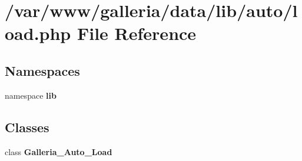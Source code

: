 \section{/var/www/galleria/data/lib/auto/load.php File Reference}
\label{load_8php}
\subsection*{Namespaces}
\begin{CompactItemize}
\item 
namespace {\bf lib}
\end{CompactItemize}
\subsection*{Classes}
\begin{CompactItemize}
\item 
class {\bf Galleria\_\-Auto\_\-Load}
\end{CompactItemize}
